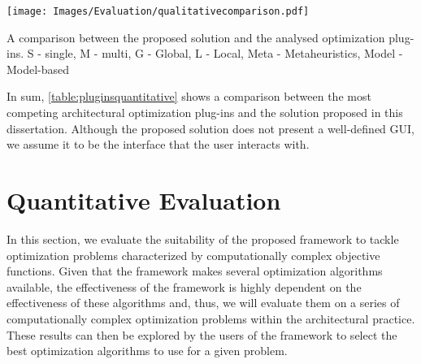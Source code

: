\begin{table}[htbp]		
	\centering
	\texttt{[image: Images/Evaluation/qualitativecomparison.pdf]}
	\caption[Comparison between the proposed solution and the analysed optimization plug-ins]{A comparison between the proposed solution and the analysed optimization plug-ins. S - single, M - multi, G - Global, L - Local, Meta - Metaheuristics, Model - Model-based}
	\label{table:pluginsquantitative}
\end{table}

In sum, \cref{table:pluginsquantitative} shows a comparison between the most competing architectural optimization plug-ins and the solution proposed in this dissertation. Although the proposed solution does not present a well-defined \ac{GUI}, we assume it to be the interface that the user interacts with.
\section{Quantitative Evaluation}
\label{sec:quantitative}

In this section, we evaluate the suitability of the proposed framework to tackle optimization problems characterized by computationally complex objective functions. Given that the framework makes several optimization algorithms available, the effectiveness of the framework is highly dependent on the effectiveness of these algorithms and, thus, we will evaluate them on a series of computationally complex optimization problems within the architectural practice. These results can then be explored by the users of the framework to select the best optimization algorithms to use for a given problem.


